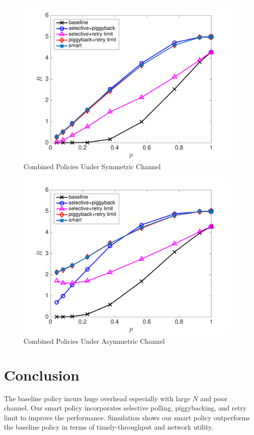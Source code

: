 \documentclass{article}
\begin{document}
\begin{figure}[htbp]
\centering
\includegraphics[scale=0.5]{sym_threecombinepolicys.pdf}
\caption{Combined Policies Under Symmetric Channel}
\label{Combined Policies Under Symmetric Channel}
\end{figure}

\begin{figure}[htbp]
\centering
\includegraphics[scale=0.5]{asym_threecombinepolicys.pdf}
\caption{Combined Policies Under Asymmetric Channel}
\label{Combined Policies Under Asymmetric Channel}
\end{figure}


\section{Conclusion}
The baseline policy incurs huge overhead especially with large $N$ and poor channel. Our smart policy incorporates selective polling, piggybacking, and retry limit to improve the performance. Simulation shows our smart policy outperforms the baseline policy in terms of timely-throughput and network utility.
\end{document}
